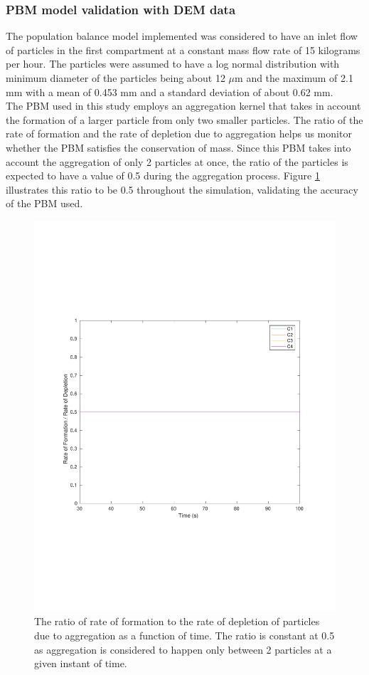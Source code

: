 \documentclass[preprint,11pt,authoryear]{elsarticle}
\begin{document}
\subsubsection{PBM model validation with DEM data}
 The population balance model implemented was considered to have an inlet flow of particles in the 
first compartment at a constant mass flow rate of 15 kilograms per hour. The particles were assumed 
to have a log normal distribution with minimum diameter of the particles being about 12 $\mu$m and the 
maximum of 2.1 mm with a mean of 0.453 mm and a standard deviation of about 0.62 mm. \\
The PBM used in this study employs an aggregation kernel that takes in account the formation of a 
larger particle from only two smaller particles. The ratio of the rate of formation and the rate of 
depletion due to aggregation helps us monitor whether the PBM satisfies the conservation of mass. 
Since this PBM takes into account the aggregation of only 2 particles at once, the ratio of the particles 
is expected to have a value of 0.5 during the aggregation process. Figure \ref{fig:rslts_PBM_ratio_plot_2mm}
 illustrates this ratio to be 0.5 throughout the simulation, validating the accuracy of the PBM used.
\begin{figure}
\begin{center}
\includegraphics[scale=0.5]{rslts_PBM_2mm_validation.pdf}
\caption{The ratio of rate of formation to the rate of depletion of particles due to 
aggregation as a function of time. The ratio is constant at 0.5 as aggregation is 
considered to happen only between 2 particles at a given instant of time.}
\label{fig:rslts_PBM_ratio_plot_2mm}
\end{center}
\end{figure}
\end{document}
